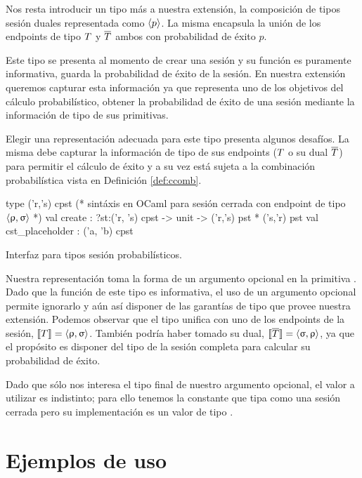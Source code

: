 Nos resta introducir un tipo más a nuestra extensión, la composición de tipos
sesión duales representada como $\langle p \rangle$. La misma encapsula la
unión de los endpoints de tipo $T$ y $\overline{T}$ ambos con probabilidad de éxito
$p$. 

Este tipo se presenta al momento de crear una sesión y su función es puramente
informativa, guarda la probabilidad de éxito de la sesión. En nuestra extensión
queremos capturar esta información ya que representa uno de los objetivos del
cálculo probabilístico, obtener la probabilidad de éxito de una sesión mediante
la información de tipo de sus primitivas.

Elegir una representación adecuada para este tipo presenta algunos desafíos.
La misma debe capturar la información de tipo de sus endpoints ($T$ o su
dual $\overline{T}$) para permitir el cálculo de éxito y a su vez está sujeta a la
combinación probabilística vista en Definición \ref{def:ccomb}.

\begin{table}[htb]
	\begin{OCamlD}[frame=single]
  type ('r,'s) cpst (* sintáxis en OCaml para sesión cerrada
                     con endpoint de tipo $\langle\uprho,\upsigma\rangle$ *)
  val create  : ?st:('r, 's) cpst -> unit -> ('r,'s) pst * ('s,'r) pst
  val cst_placeholder : ('a, 'b) cpst
	\end{OCamlD}
	\caption{Interfaz \OCaml para tipos sesión probabilísticos.}
	\label{tab:create_cpst_sig}
\end{table}

Nuestra representación toma la forma de un argumento opcional en la primitiva
. Dado que la función de este tipo es informativa, el uso de un
argumento opcional permite ignorarlo y aún así disponer de las garantías de
tipo que provee nuestra extensión. Podemos observar que el tipo unifica con uno
de los endpoints de la sesión, $\llbracket T\rrbracket = \langle\uprho,\upsigma\rangle$. También
podría haber tomado su dual, $\llbracket\overline{T}\rrbracket = \langle\upsigma,\uprho\rangle$, ya que
el propósito es disponer del tipo de la sesión completa para calcular su
probabilidad de éxito.

Dado que sólo nos interesa el tipo final de nuestro argumento opcional, el
valor a utilizar es indistinto; para ello tenemos la constante
 que tipa como una sesión cerrada pero su implementación es
un valor de tipo .

\section{Ejemplos de uso}

